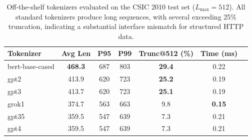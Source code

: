 \begin{table}[t]
\centering
\scriptsize
\setlength{\tabcolsep}{4pt}
\begin{tabular*}{\columnwidth}{@{\extracolsep{\fill}}lcccccc@{}}
\toprule
Tokenizer & Avg Len & P95 & P99 & Trunc@512 (\%) & Time (ms) \\
\midrule
bert-base-cased & \textbf{468.3} & 687 & 803 & \textbf{29.4} & 0.22 \\
gpt2            & 413.9 & 620 & 723 & \textbf{25.2} & 0.19 \\
gpt3            & 413.7 & 620 & 723 & \textbf{25.1} & 0.19 \\
grok1           & 374.7 & 563 & 663 & 9.8 & \textbf{0.15} \\
gpt35           & 359.5 & 547 & 639 & 7.3 & 0.21 \\
gpt4            & 359.5 & 547 & 639 & 7.3 & 0.21 \\
\bottomrule
\end{tabular*}
\caption{Off-the-shelf tokenizers evaluated on the CSIC 2010 test set ($L_{\max}=512$). All standard tokenizers produce long sequences, with several exceeding 25\% truncation, indicating a substantial interface mismatch for structured HTTP data.}
\label{tab:e0_tokenizer_playground}
\end{table}
